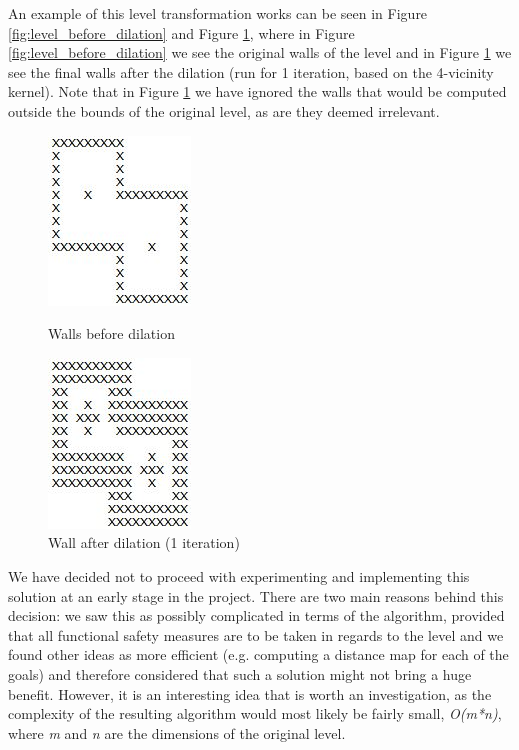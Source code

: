 \documentclass[letterpaper]{article}
\begin{document}
An example of this level transformation works can be seen in Figure \ref{fig:level_before_dilation} and Figure \ref{fig:level_after_dilation}, where in Figure \ref{fig:level_before_dilation} we see the original walls of the level and in Figure \ref{fig:level_after_dilation} we see the final walls after the dilation (run for 1 iteration, based on the 4-vicinity kernel). Note that in Figure \ref{fig:level_after_dilation} we have ignored the walls that would be computed outside the bounds of the original level, as are they deemed irrelevant.

\begin{figure}[!htb]
\centering
\begin{minipage}[b]{0.45\linewidth}
	\centering
	\includegraphics[scale=0.4]{level_before_dilation.JPG}
	\caption{Walls before dilation}
	\label{fig:level_before_dilation}
\end{minipage}
\quad
\begin{minipage}[b]{0.45\linewidth}
	\centering
	\includegraphics[scale=0.5]{level_after_dilation.JPG}
	\caption{Wall after dilation (1 iteration)}
	\label{fig:level_after_dilation}
\end{minipage}
\end{figure}

We have decided not to proceed with experimenting and implementing this solution at an early stage in the project. There are two main reasons behind this decision: we saw this as possibly complicated in terms of the algorithm, provided that all functional safety measures are to be taken in regards to the level and we found other ideas as more efficient (e.g. computing a distance map for each of the goals) and therefore considered that such a solution might not bring a huge benefit. However, it is an interesting idea that is worth an investigation, as the complexity of the resulting algorithm would most likely be fairly small, \textit{O(m*n)}, where \textit{m} and \textit{n} are the dimensions of the original level.
\end{document}
